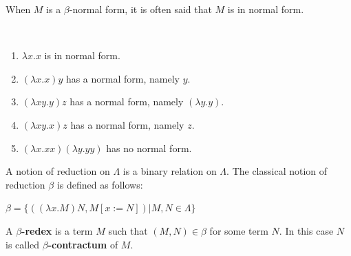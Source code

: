 When $M$ is a $\beta$-normal form, it is often said that $M$ is in normal form.

\begin{example} \
\begin{enumerate}
\item $\lambda x.x$ is in normal form.
\item $(\lambda x.x)y$ has a normal form, namely $y$.
\item $(\lambda xy.y)z$ has a normal form, namely $(\lambda y.y)$.
\item $(\lambda xy.x)z$ has a normal form, namely $z$.
\item $(\lambda x.xx)(\lambda y.yy)$ has no normal form.
\end{enumerate}
\end{example}

A notion of reduction on $\Lambda$ is a binary relation on $\Lambda$. The classical notion of reduction $\beta$ is defined as follows:
\begin{definition} $\beta = \{ ( (\lambda x. M)N , M[x:=N] ) | M, N \in \Lambda  \} $
\end{definition}

\begin{definition} 
A \textbf{$\beta$-redex} is a term $M$ such that $(M,N) \in \beta$ for some term $N$. In this case $N$ is called \textbf{$\beta$-contractum} of $M$.
\end{definition}

